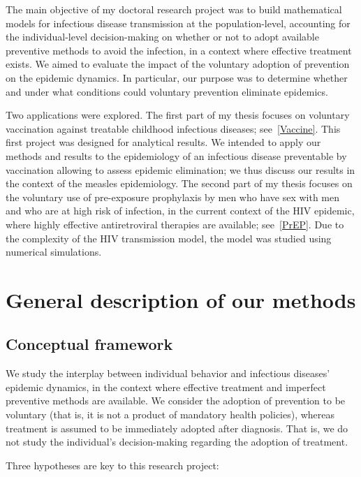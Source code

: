 The main objective of my doctoral research project was to build mathematical models for infectious disease transmission at the population-level, accounting for the individual-level decision-making on whether or not to adopt available preventive methods to avoid the infection, in a context where effective treatment exists. We aimed to evaluate the impact of the voluntary adoption of prevention on the epidemic dynamics. In particular, our purpose was to determine whether and under what conditions could voluntary prevention eliminate epidemics.

Two applications were explored. The first part of my thesis focuses on voluntary vaccination against treatable childhood infectious diseases; see~\autoref{Vaccine}. This first project was designed for analytical results. We intended to apply our methods and results to the epidemiology of an infectious disease preventable by vaccination allowing to assess epidemic elimination; we thus discuss our results in the context of the measles epidemiology. The second part of my thesis focuses on the voluntary use of pre-exposure prophylaxis by men who have sex with men and who are at high risk of infection, in the current context of the HIV epidemic, where highly effective antiretroviral therapies are available; see~\autoref{PrEP}. Due to the complexity of the HIV transmission model, the model was studied using numerical simulations.



\section{General description of our methods}

\subsection{Conceptual framework}
\label{Intro:Framework} 

We study the interplay between individual behavior and infectious diseases' epidemic dynamics, in the context where effective treatment and imperfect preventive methods are available. We consider the adoption of prevention to be voluntary (that is, it is not a product of mandatory health policies), whereas treatment is assumed to be immediately adopted after diagnosis. That is, we do not study the individual's decision-making regarding the adoption of treatment. 

Three hypotheses are key to this research project:

